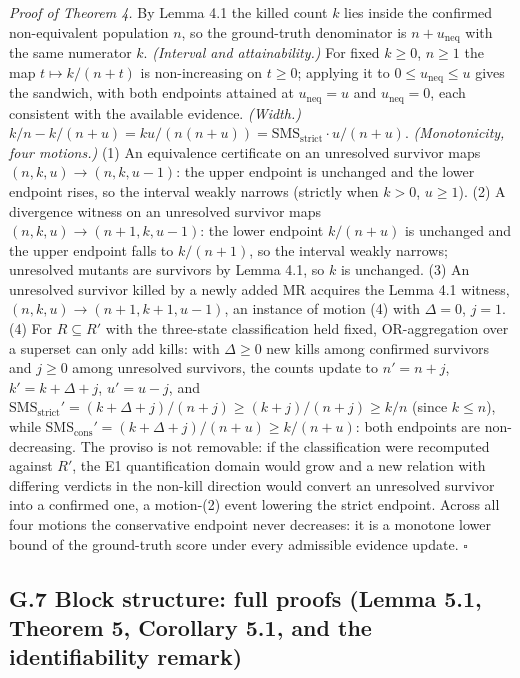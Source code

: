 \documentclass[manuscript,screen,review]{acmart}
\begin{document}
\emph{Proof of Theorem 4.} By Lemma 4.1 the killed count $k$ lies inside
the confirmed non-equivalent population $n$, so the ground-truth
denominator is $n+u_{\mathrm{neq}}$ with the same numerator $k$.
\emph{(Interval and attainability.)} For fixed $k\ge0$, $n\ge1$ the map
$t\mapsto k/(n+t)$ is non-increasing on $t\ge0$; applying it to
$0\le u_{\mathrm{neq}}\le u$ gives the sandwich, with both endpoints
attained at $u_{\mathrm{neq}}=u$ and $u_{\mathrm{neq}}=0$, each
consistent with the available evidence. \emph{(Width.)}
$k/n-k/(n+u)=ku/(n(n+u))=\mathrm{SMS}_{\mathrm{strict}}\cdot u/(n+u)$.
\emph{(Monotonicity, four motions.)} (1) An equivalence certificate on
an unresolved survivor maps $(n,k,u)\to(n,k,u-1)$: the upper endpoint is
unchanged and the lower endpoint rises, so the interval weakly narrows
(strictly when $k>0$, $u\ge1$). (2) A divergence witness on an
unresolved survivor maps $(n,k,u)\to(n+1,k,u-1)$: the lower endpoint
$k/(n+u)$ is unchanged and the upper endpoint falls to $k/(n+1)$, so the
interval weakly narrows; unresolved mutants are survivors by Lemma 4.1,
so $k$ is unchanged. (3) An unresolved survivor killed by a newly added
MR acquires the Lemma 4.1 witness, $(n,k,u)\to(n+1,k+1,u-1)$, an
instance of motion (4) with $\Delta=0$, $j=1$. (4) For
$R\subseteq R'$ with the three-state classification held fixed,
OR-aggregation over a superset can only add kills: with $\Delta\ge0$ new
kills among confirmed survivors and $j\ge0$ among unresolved survivors,
the counts update to $n'=n+j$, $k'=k+\Delta+j$, $u'=u-j$, and
$\mathrm{SMS}_{\mathrm{strict}}'=(k+\Delta+j)/(n+j)\ge(k+j)/(n+j)\ge k/n$
(since $k\le n$), while
$\mathrm{SMS}_{\mathrm{cons}}'=(k+\Delta+j)/(n+u)\ge k/(n+u)$: both
endpoints are non-decreasing. The proviso is not removable: if the
classification were recomputed against $R'$, the E1 quantification
domain would grow and a new relation with differing verdicts in the
non-kill direction would convert an unresolved survivor into a confirmed
one, a motion-(2) event lowering the strict endpoint. Across all four
motions the conservative endpoint never decreases: it is a monotone
lower bound of the ground-truth score under every admissible evidence
update. $\square$

\subsection{G.7 Block structure: full proofs (Lemma 5.1, Theorem 5, Corollary 5.1, and the identifiability remark)}\label{g.7-gap-proofs}
\end{document}
